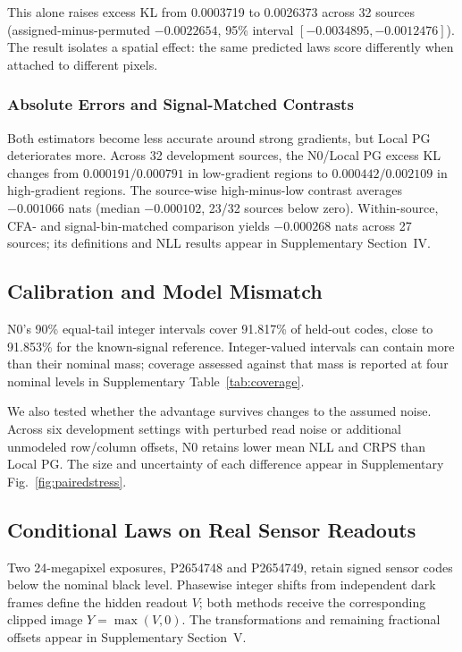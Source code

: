 \documentclass[10pt,twocolumn,journal]{IEEEtran}
\begin{document}
This alone raises excess KL from 0.0003719 to 0.0026373 across 32 sources (assigned-minus-permuted $-0.0022654$, 95\% interval $[-0.0034895,-0.0012476]$). The result isolates a spatial effect: the same predicted laws score differently when attached to different pixels.

\subsubsection{Absolute Errors and Signal-Matched Contrasts}\label{sec:gradientcontrol}
Both estimators become less accurate around strong gradients, but Local PG deteriorates more. Across 32 development sources, the N0/Local PG excess KL changes from $0.000191/0.000791$ in low-gradient regions to $0.000442/0.002109$ in high-gradient regions. The source-wise high-minus-low contrast averages $-0.001066$ nats (median $-0.000102$, 23/32 sources below zero). Within-source, CFA- and signal-bin-matched comparison yields $-0.000268$ nats across 27 sources; its definitions and NLL results appear in Supplementary Section~IV.

\subsection{Calibration and Model Mismatch}
N0's 90\% equal-tail integer intervals cover 91.817\% of held-out codes, close to 91.853\% for the known-signal reference. Integer-valued intervals can contain more than their nominal mass; coverage assessed against that mass is reported at four nominal levels in Supplementary Table~\ref{tab:coverage}.





We also tested whether the advantage survives changes to the assumed noise. Across six development settings with perturbed read noise or additional unmodeled row/column offsets, N0 retains lower mean NLL and CRPS than Local PG. The size and uncertainty of each difference appear in Supplementary Fig.~\ref{fig:pairedstress}.

\subsection{Conditional Laws on Real Sensor Readouts}
Two 24-megapixel exposures, P2654748 and P2654749, retain signed sensor codes below the nominal black level. Phasewise integer shifts from independent dark frames define the hidden readout $V$; both methods receive the corresponding clipped image $Y=\max(V,0)$. The transformations and remaining fractional offsets appear in Supplementary Section~V.
\end{document}
